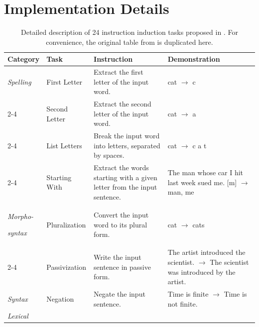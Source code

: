 \newpage
\section{Implementation Details}\label{app:imp_details}
\begin{table}[H]
\caption{Detailed description of 24 instruction induction tasks proposed in \citet{honovich2022instruction}. For convenience, the original table from \cite{honovich2022instruction} is duplicated here.}
\small
\centering
\begin{tabular}{@{}p{}@{}p{}@{}p{}p{}@{}}
\toprule
\textbf{Category}                           & \textbf{Task}           & \textbf{Instruction}                                             & \textbf{Demonstration} \\
\midrule
\textit{Spelling} & First Letter & Extract the first letter of the input word. & cat $\rightarrow$  c \\
\cmidrule{2-4}
 & Second Letter & Extract the second letter of the input word. & cat $\rightarrow$  a \\
\cmidrule{2-4}
 & List Letters & Break the input word into letters, separated by spaces. & cat $\rightarrow$  c a t\\
\cmidrule{2-4}
& Starting With & Extract the words starting with a given letter from the input sentence. & The man whose car I hit last week sued me. [m] $\rightarrow$  man, me \\
\midrule
\textit{Morpho-}

\textit{syntax} & Pluralization  & Convert the input word to its plural form.                   & cat $\rightarrow$  cats \\
\cmidrule{2-4} 
                                   & Passivization  & Write the input sentence in passive form.             &
The artist introduced the scientist. $\rightarrow$  The scientist was introduced by the artist. \\
\midrule
\textit{Syntax}                             & Negation       & Negate the input sentence.   & Time is finite $\rightarrow$  Time is not finite. \\
\midrule
\textit{Lexical} 


\end{tabular}
\end{table}
